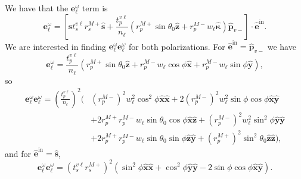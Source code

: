 We have that the $\mathbf{e}^{\omega}_{\ell}$ term is 
\begin{equation*}\label{eqapp:ewellmr}
\mathbf{e}^{\omega}_{\ell} = 
\left[
\hat{\mathbf{s}}t_{s}^{v\ell}r_{s}^{M+}\hat{\mathbf{s}} 
+ \frac{t^{v\ell}_{p}}{n_{\ell}}
\left(
  r^{M+}_{p}\sin\theta_{0}\hat{\mathbf{z}} 
+ r^{M-}_{p}w_{\ell}\hat{\boldsymbol{\kappa}}
\right)
\hat{\mathbf{p}}_{v-}
\right]
\cdot\hat{\mathbf{e}}^{\mathrm{in}}.
\end{equation*}
We are interested in finding
$\mathbf{e}^{\omega}_{\ell}\mathbf{e}^{\omega}_{\ell}$ for both polarizations.
For $\hat{\mathbf{e}}^{\mathrm{in}} = \hat{\mathbf{p}}_{v-}$ we have
\begin{equation*}
\mathbf{e}^{\omega}_{\ell} = 
\frac{t^{v\ell}_{p}}{n_{\ell}}
\left(
  r^{M+}_{p}\sin\theta_{0}\hat{\mathbf{z}} 
+ r^{M-}_{p}w_{\ell}\cos\phi\hat{\mathbf{x}}
+ r^{M-}_{p}w_{\ell}\sin\phi\hat{\mathbf{y}}
\right),
\end{equation*}
so
\begin{equation}\label{eqapp:ewewpmr}
\begin{split}
\mathbf{e}^{\omega}_{\ell}\mathbf{e}^{\omega}_{\ell} =
\left(\frac{t^{v\ell}_{p}}{n_{\ell}}\right)^{2}
\bigg(&
   \left(r^{M-}_{p}\right)^{2}w^{2}_{\ell}\cos^{2}\phi
   \hat{\mathbf{x}}\hat{\mathbf{x}}
 + 2\left(r^{M-}_{p}\right)^{2}w^{2}_{\ell}\sin\phi\cos\phi
   \hat{\mathbf{x}}\hat{\mathbf{y}}\\
&+ 2r^{M+}_{p}r^{M-}_{p}w_{\ell}\sin\theta_{0}\cos\phi
   \hat{\mathbf{x}}\hat{\mathbf{z}}
 + \left(r^{M-}_{p}\right)^{2}w^{2}_{\ell}\sin^{2}\phi
   \hat{\mathbf{y}}\hat{\mathbf{y}}\\
&+ 2r^{M+}_{p}r^{M-}_{p}w_{\ell}\sin\theta_{0}\sin\phi
   \hat{\mathbf{z}}\hat{\mathbf{y}}
 + \left(r^{M+}_{p}\right)^{2}\sin^{2}\theta_{0}
   \hat{\mathbf{z}}\hat{\mathbf{z}}
\bigg),
\end{split}
\end{equation}
and for $\hat{\mathbf{e}}^{\mathrm{in}} = \hat{\mathbf{s}}$,
\begin{equation}\label{eqapp:ewewsmr}
\mathbf{e}^{\omega}_{\ell}\mathbf{e}^{\omega}_{\ell}
= \left(t^{v\ell}_{s}r^{M+}_{s}\right)^{2}
\left(
  \sin^{2}\phi\hat{\mathbf{x}}\hat{\mathbf{x}}
+ \cos^{2}\phi\hat{\mathbf{y}}\hat{\mathbf{y}} 
- 2\sin\phi\cos\phi\hat{\mathbf{x}}\hat{\mathbf{y}}
\right).
\end{equation}

